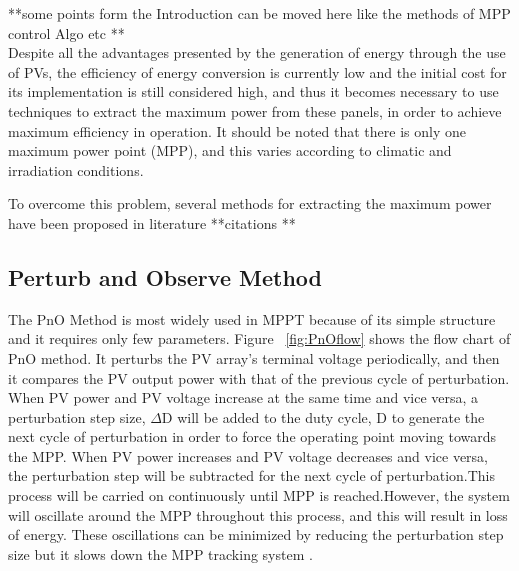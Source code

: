 {**some points form the Introduction can be moved here like the methods of MPP control Algo etc ** \\

Despite all the advantages presented by the generation of energy through the use of PVs, the efficiency of energy conversion is currently low and the initial cost for its implementation is still considered high, and thus it becomes necessary to use techniques to extract the maximum power from these panels, in order to achieve maximum efficiency in operation. It should be noted that there is only one maximum power point (MPP), and this varies according to climatic and irradiation conditions\cite{eltawil2013mppt}.

To overcome this problem, several methods for extracting the maximum power have been proposed in literature **citations **

\subsection{Perturb and Observe Method }
  The \ac{PnO} Method is most widely used in \ac{MPPT} because of  its simple structure and it requires only few parameters. Figure ~\ref{fig:PnOflow}  shows the flow chart of \ac{PnO} method. It perturbs the PV array's terminal voltage periodically, and then it compares the PV output power with that of the previous cycle of perturbation. When PV power and PV voltage increase at the same time and vice versa, a perturbation step size, ${\Delta}$D will be added to the duty cycle, D to generate the next cycle of   perturbation in order to force the operating point moving towards the \ac{MPP}. When PV power increases and PV voltage decreases and vice versa, the perturbation step will be subtracted for the next cycle of perturbation.This process will be carried on continuously until \ac{MPP} is reached.However, the system will oscillate around the \ac{MPP} throughout this process, and this will result in loss of energy. These oscillations can be minimized by reducing the perturbation step size but it slows down the \ac{MPP} tracking system \cite{ngan2011study}.  \\
  
}
